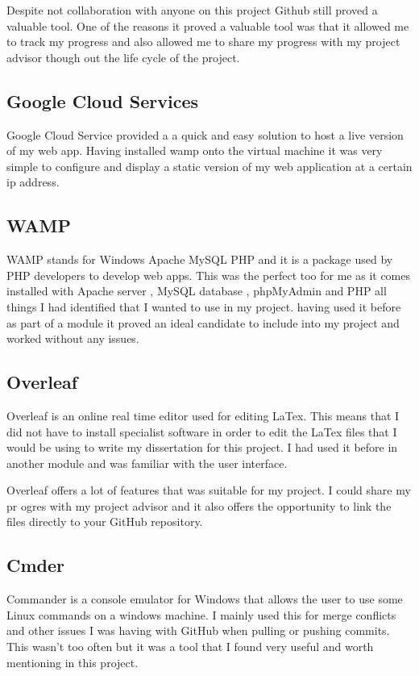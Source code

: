 Despite not collaboration with anyone on this project Github still proved a valuable tool. One of the reasons it proved a valuable tool was that it allowed me to track my progress and also allowed me to share my progress with my project advisor though out the life cycle of the project. 

\subsection{Google Cloud Services}
Google Cloud Service provided a a quick and easy solution to host a live version of my web app. Having installed wamp onto the virtual machine it was very simple to configure and display a static version of my web application at a certain ip address.

\subsection{WAMP}
WAMP stands for Windows Apache MySQL PHP and it is a package used by PHP developers to develop web apps. This was the perfect too for me as it comes installed with Apache server , MySQL database , phpMyAdmin and PHP all things I had identified that I wanted to use in my project. having used it before as part of a module it proved an ideal candidate to include into my project and worked without any issues.

\subsection{Overleaf}
Overleaf is an online real time editor used for editing LaTex. This means that I did not have to install specialist software in order to edit the LaTex files that I would be using to write my dissertation for this project. I had used it before in another module and was familiar with the user interface.

Overleaf offers a lot of features that was suitable for my project. I could share my pr ogres with my project advisor and it also offers the opportunity to link the files directly to your GitHub repository.

\subsection{Cmder}
Commander is a console emulator for Windows that allows the user to use some Linux commands on a windows machine. I mainly used this for merge conflicts and other issues I was having with GitHub when pulling or pushing commits. This wasn't too often but it was a tool that I found very useful and worth mentioning in this project.

